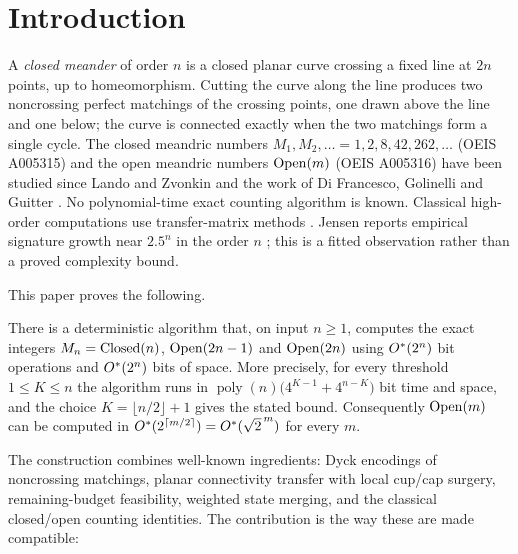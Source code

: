 \section{Introduction}
\label{sec:intro}

A \emph{closed meander} of order $n$ is a closed planar curve crossing a fixed
line at $2n$ points, up to homeomorphism. Cutting the curve along the line
produces two noncrossing perfect matchings of the crossing points, one drawn
above the line and one below; the curve is connected exactly when the two
matchings form a single cycle. The closed meandric numbers
$M_1,M_2,\dots=1,2,8,42,262,\dots$ (OEIS A005315) and the open meandric numbers
$\operatorname{Open}(m)$ (OEIS A005316) have been studied since Lando and Zvonkin
\cite{LandoZvonkin1992} and the work of Di Francesco, Golinelli and Guitter
\cite{DFGG1997Arch,DFGG1996Direct,DFGG1997TL}. No polynomial-time exact counting
algorithm is known. Classical high-order computations use transfer-matrix
methods \cite{Jensen2000,DFGJ2000,Jensen2025}. Jensen reports empirical
signature growth near $2.5^{n}$ in the order $n$ \cite{Jensen2025}; this is
a fitted observation rather than a proved complexity bound.

This paper proves the following.

\begin{theorem}
\label{thm:main}
There is a deterministic algorithm that, on input $n\ge1$, computes the exact
integers $M_n=\operatorname{Closed}(n)$, $\operatorname{Open}(2n-1)$ and $\operatorname{Open}(2n)$ using
$O^{*}(2^{n})$ bit operations and $O^{*}(2^{n})$ bits of space.
More precisely, for every threshold $1\le K\le n$ the algorithm runs in
$\operatorname{poly}(n)\bigl(4^{K-1}+4^{n-K}\bigr)$ bit time and space, and the
choice $K=\lfloor n/2\rfloor+1$ gives the stated bound. Consequently
$\operatorname{Open}(m)$ can be computed in $O^{*}(2^{\lceil m/2\rceil})=O^{*}(\sqrt2^{\,m})$
for every $m$.
\end{theorem}

The construction combines well-known ingredients: Dyck encodings of noncrossing
matchings, planar connectivity transfer with local cup/cap surgery, remaining-budget
feasibility, weighted state merging, and the classical closed/open counting
identities. The contribution is the way these are made compatible:

